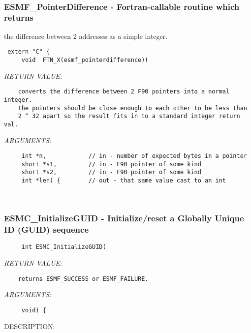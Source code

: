  
\mbox{}\hrulefill\
 
\subsubsection [ESMF\_PointerDifference] {ESMF\_PointerDifference - Fortran-callable routine which returns}


     the difference between 2 addresses as a simple integer.
  
\begin{verbatim} extern "C" {
     void  FTN_X(esmf_pointerdifference)(\end{verbatim}{\em RETURN VALUE:}
\begin{verbatim}    converts the difference between 2 F90 pointers into a normal integer.
    the pointers should be close enough to each other to be less than
    2 ^ 32 apart so the result fits in to a standard integer return val.\end{verbatim}{\em ARGUMENTS:}
\begin{verbatim}     int *n,            // in - number of expected bytes in a pointer
     short *s1,         // in - F90 pointer of some kind
     short *s2,         // in - F90 pointer of some kind
     int *len) {        // out - that same value cast to an int\end{verbatim}
 
 
\mbox{}\hrulefill\
 
\subsubsection [ESMC\_InitializeGUID] {ESMC\_InitializeGUID - Initialize/reset a Globally Unique ID (GUID) sequence}


  
\begin{verbatim}     int ESMC_InitializeGUID(\end{verbatim}{\em RETURN VALUE:}
\begin{verbatim}    returns ESMF_SUCCESS or ESMF_FAILURE.\end{verbatim}{\em ARGUMENTS:}
\begin{verbatim}     void) {
 \end{verbatim}
{\sf DESCRIPTION:\\ }


